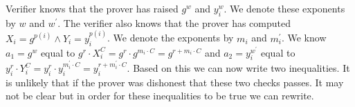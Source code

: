  Verifier knows that the prover has raised \begin{math}g^w\end{math} and \begin{math}y_i^w\end{math}. We denote these exponents by \begin{math}w\end{math}    and \begin{math}w^{'}\end{math}. The verifier also knows that the prover has computed \begin{math}X_i=g^{p(i)}  \land Y_i=y_i^{p(i)} \end{math}. We denote the exponents by \begin{math}m_i\end{math} and \begin{math}m_i^{'}\end{math}. We know
\begin{math} a_1= g^w \end{math} equal to \begin{math}g^r  \cdot  X_i^C=g^r \cdot g^{m_i \cdot C} = g^{r+m_i \cdot C}\end{math} and
\begin{math} a_2= y_i^{w^{'}}\end{math} equal to \begin{math}y_i^r  \cdot  Y_i^C=y_i^r \cdot y_i^{m_i^{'} \cdot C} = y_i^{r+m_i^{'} \cdot C}\end{math}.
Based on this we can now write two inequalities. It is unlikely that if the prover was dishonest that these two checks passes. It may not be clear but in order for these inequalities to be true we can rewrite.

